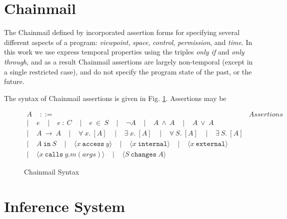 \documentclass[acmsmall,review,anonymous]{acmart}\settopmatter{printfolios=true,printccs=false,printacmref=false}
\newcommand\calls[4]{\langle #1\ \texttt{calls}\ #2.#3(#4) \rangle}
\newcommand\changes[2]{\langle #1\ \texttt{changes}\ #2 \rangle}
\newcommand\access[2]{\langle #1\ \texttt{access}\ #2 \rangle}
\newcommand\internal[1]{\langle #1\ \texttt{internal}\rangle}
\newcommand\external[1]{\langle #1\ \texttt{external}\rangle}
\begin{document}
\section{Chainmail}

The Chainmail defined by \citeauthor{FASE} incorporated assertion forms for 
specifying several different aspects of a program: \emph{viewpoint}, \emph{space}, 
\emph{control}, \emph{permission}, and \emph{time}. In this work we use express
temporal properties using the triples \emph{only if} and \emph{only through}, 
and as a result Chainmail assertions are largely non-temporal 
(except in a single restricted case), and do not specify the program state
of the past, or the future.

The syntax of Chainmail assertions is given in Fig. \ref{f:chainmail_assertions}.
Assertions may be 

\begin{figure}[h]
\[
\begin{array}{lr}
A\;\;\;\; ::= & \textit{Assertions}\\  
|\;\;\;\; e                        \;\;\;\;  
|\;\;\;\; e\ :\ C                  \;\;\;\;
|\;\;\;\; e\ \in\ S                \;\;\;\;
|\;\;\;\; \neg A 					\;\;\;\;
|\;\;\;\; A\ \wedge\ A 			\;\;\;\;
|\;\;\;\; A\ \vee\ A \\
|\;\;\;\; A\ \longrightarrow\ A 	\;\;\;\;
|\;\;\;\; \forall\ x.\ [A] 		\;\;\;\;
|\;\;\;\; \exists\ x.\ [A] 		\;\;\;\;
|\;\;\;\; \forall\ S.\ [A] 		\;\;\;\;
|\;\;\;\; \exists\ S.\ [A] 		\\
|\;\;\;\; A\ \texttt{in}\ S        \;\;\;\; 
|\;\;\;\; \access{x}{y}            \;\;\;\;
|\;\;\;\; \internal{x}             \;\;\;\; 
|\;\;\;\; \external{x}             \\
|\;\;\;\; \calls{x}{y}{m}{args} 	\;\;\;\;
|\;\;\;\; \changes{S}{A} 			
\end{array}
\]
\caption{Chainmail Syntax}
\label{f:chainmail_assertions}
\end{figure}

\section{Inference System}
\end{document}
